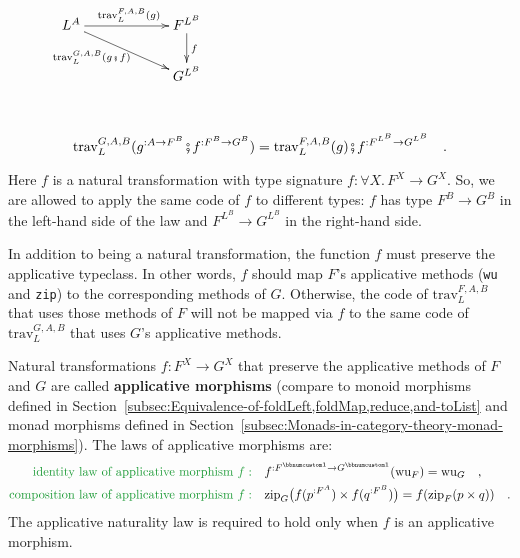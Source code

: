 \begin{wrapfigure}{l}{0.26\columnwidth}%
\vspace{-1.3\baselineskip}
$\xymatrix{\xyScaleY{1.7pc}\xyScaleX{5.0pc}L^{A}\ar[rd]\sb(0.4){\text{trav}_{L}^{G,A,B}(g\bef f)~~}\ar[r]\sp(0.5){\text{trav}_{L}^{F,A,B}(g)} & F^{L^{B}}\ar[d]\sp(0.45){f}\\
 & G^{L^{B}}
}
$\vspace{0.5\baselineskip}
\end{wrapfigure}%

~\vspace{-1.5\baselineskip}

\begin{equation}
\text{trav}_{L}^{G,A,B}(g^{:A\rightarrow F^{B}}\bef f^{:F^{B}\rightarrow G^{B}})=\text{trav}_{L}^{F,A,B}(g)\bef f^{:F^{L^{B}}\rightarrow G^{L^{B}}}\quad.\label{eq:traverse-applicative-naturality-law}
\end{equation}

\noindent Here $f$ is a natural transformation with type signature
$f:\forall X.\,F^{X}\rightarrow G^{X}$. So, we are allowed to apply
the same code of $f$ to different types: $f$ has type $F^{B}\rightarrow G^{B}$
in the left-hand side of the law and $F^{L^{B}}\rightarrow G^{L^{B}}$
in the right-hand side.

In addition to being a natural transformation, the function $f$ must
preserve the applicative typeclass. In other words, $f$ should map
$F$\textsf{'}s applicative methods (\lstinline!wu! and \lstinline!zip!)
to the corresponding methods of $G$. Otherwise, the code of $\text{trav}_{L}^{F,A,B}$
that uses those methods of $F$ will not be mapped via $f$ to the
same code of $\text{trav}_{L}^{G,A,B}$ that uses $G$\textsf{'}s applicative
methods. 

Natural transformations $f:F^{X}\rightarrow G^{X}$ that preserve
the applicative methods of $F$ and $G$ are called \textbf{applicative
morphisms} (compare to monoid morphisms defined in Section~\ref{subsec:Equivalence-of-foldLeft,foldMap,reduce,and-toList}
and monad morphisms defined in Section~\ref{subsec:Monads-in-category-theory-monad-morphisms}).
The laws of applicative morphisms are:
\begin{align}
{\color{greenunder}\text{identity law of applicative morphism }f:}\quad & f^{:F^{\bbnum 1}\rightarrow G^{\bbnum 1}}(\text{wu}_{F})=\text{wu}_{G}\quad,\label{eq:identity-law-of-applicative-morphism}\\
{\color{greenunder}\text{composition law of applicative morphism }f:}\quad & \text{zip}_{G}\big(f(p^{:F^{A}})\times f(q^{:F^{B}})\big)=f(\text{zip}_{F}(p\times q))\quad.\label{eq:composition-law-of-applicative-morphism}
\end{align}
The applicative naturality law is required to hold only when $f$
is an applicative morphism.

